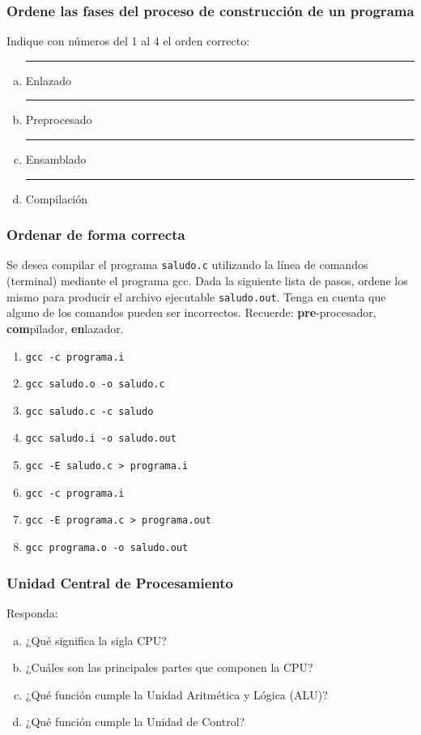 \subsubsection{Ordene las fases del proceso de construcción de un programa}
Indique con números del 1 al 4 el orden correcto:
\begin{enumerate}[a)]
  \item \rule{1cm}{0.1pt} Enlazado  
  \item \rule{1cm}{0.1pt} Preprocesado  
  \item \rule{1cm}{0.1pt} Ensamblado  
  \item \rule{1cm}{0.1pt} Compilación  
\end{enumerate}

\subsubsection{Ordenar de forma correcta}
Se desea compilar el programa \texttt{saludo.c} utilizando la línea de comandos (terminal) mediante el programa gcc.
Dada la siguiente lista de pasos, ordene los mismo para producir el archivo ejecutable \texttt{saludo.out}.
Tenga en cuenta que alguno de los comandos pueden ser incorrectos.
Recuerde: \textbf{pre}-procesador, \textbf{com}pilador, \textbf{en}lazador.

\begin{enumerate}
  \item \texttt{gcc -c programa.i}
  \item \texttt{gcc saludo.o -o saludo.c}
  \item \texttt{gcc saludo.c -c saludo}
  \item \texttt{gcc saludo.i -o saludo.out}
  \item \texttt{gcc -E saludo.c > programa.i}
  \item \texttt{gcc -c programa.i}
  \item \texttt{gcc -E programa.c > programa.out}
  \item \texttt{gcc programa.o -o saludo.out}
\end{enumerate}


\subsubsection{Unidad Central de Procesamiento}
Responda:
\begin{enumerate}[a)]
  \item ¿Qué significa la sigla CPU?
  \item ¿Cuáles son las principales partes que componen la CPU?
  \item ¿Qué función cumple la Unidad Aritmética y Lógica (ALU)?
  \item ¿Qué función cumple la Unidad de Control?
\end{enumerate}


